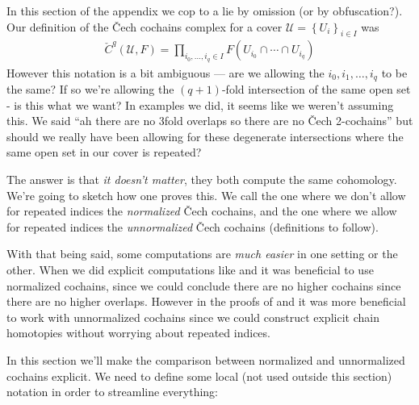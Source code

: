\documentclass[11pt]{book}
\begin{document}
In this section of the appendix we cop to a lie by omission (or by obfuscation?). Our definition of the \v{C}ech cochains complex for a cover $\mathcal{U}=\left\{ U_i \right\}_{i\in I}$ was
\begin{align*}
    \check{C}^q(\mathcal{U},F) = \prod_{i_0, \ldots, i_q\in I} F(U_{i_0}\cap \cdots \cap U_{i_q})
\end{align*}
However this notation is a bit ambiguous --- are we allowing the $i_0,i_1, \ldots, i_q$ to be the same? If so we're allowing the $(q+1)$-fold intersection of the same open set - is this what we want? In examples we did, it seems like we weren't assuming this. We said ``ah there are no 3fold overlaps so there are no \v{C}ech 2-cochains'' but should we really have been allowing for these degenerate intersections where the same open set in our cover is repeated?

The answer is that \emph{it doesn't matter}, they both compute the same cohomology. We're going to sketch how one proves this. We call the one where we don't allow for repeated indices the \emph{normalized} \v{C}ech cochains, and the one where we allow for repeated indices the \emph{unnormalized} \v{C}ech cochains (definitions to follow).

With that being said, some computations are \emph{much easier} in one setting or the other. When we did explicit computations like  and  it was beneficial to use normalized cochains, since we could conclude there are no higher cochains since there are no higher overlaps. However in the proofs of  and  it was more beneficial to work with unnormalized cochains since we could construct explicit chain homotopies without worrying about repeated indices.

In this section we'll make the comparison between normalized and unnormalized cochains explicit. We need to define some local (not used outside this section) notation in order to streamline everything:
\end{document}
